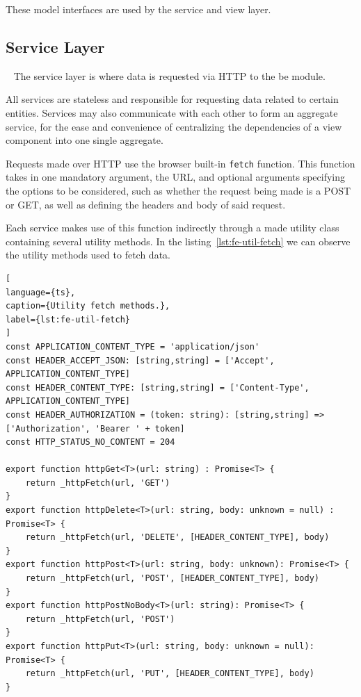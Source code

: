 These model interfaces are used by the service and view layer.


\subsection{Service Layer}~\label{ch:impl:sec:fe:subsec:service-layer}
The service layer is where data is requested via HTTP to the \acrshort{be} module.

All services are stateless and responsible for requesting data related to certain entities. Services may also communicate with each other to form an aggregate service, for the ease and convenience of centralizing the dependencies of a view component into one single aggregate.

Requests made over HTTP use the browser built-in \lstinline{fetch} function. This function takes in one mandatory argument, the URL, and optional arguments specifying the options to be considered, such as whether the request being made is a POST or GET, as well as defining the headers and body of said request.

Each service makes use of this function indirectly through a made utility class containing several utility methods. In the listing~\ref{lst:fe-util-fetch} we can observe the utility methods used to fetch data. 


\begin{lstlisting}[
language={ts},
caption={Utility fetch methods.},
label={lst:fe-util-fetch}
]
const APPLICATION_CONTENT_TYPE = 'application/json'
const HEADER_ACCEPT_JSON: [string,string] = ['Accept', APPLICATION_CONTENT_TYPE]
const HEADER_CONTENT_TYPE: [string,string] = ['Content-Type', APPLICATION_CONTENT_TYPE]
const HEADER_AUTHORIZATION = (token: string): [string,string] => ['Authorization', 'Bearer ' + token]
const HTTP_STATUS_NO_CONTENT = 204

export function httpGet<T>(url: string) : Promise<T> {
    return _httpFetch(url, 'GET')
}
export function httpDelete<T>(url: string, body: unknown = null) : Promise<T> {
    return _httpFetch(url, 'DELETE', [HEADER_CONTENT_TYPE], body)
}
export function httpPost<T>(url: string, body: unknown): Promise<T> {
    return _httpFetch(url, 'POST', [HEADER_CONTENT_TYPE], body)
}
export function httpPostNoBody<T>(url: string): Promise<T> {
    return _httpFetch(url, 'POST')
}
export function httpPut<T>(url: string, body: unknown = null): Promise<T> {
    return _httpFetch(url, 'PUT', [HEADER_CONTENT_TYPE], body)
}
\end{lstlisting}


